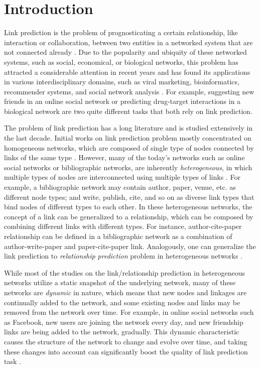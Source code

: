 \section{Introduction}\label{sec:intro}
Link prediction is the problem of prognosticating a certain relationship, like interaction or collaboration, between two entities in a networked system that are not connected already \cite{lu2011link}. Due to the popularity and ubiquity of these networked systems, such as social, economical, or biological networks, this problem has attracted a considerable attention in recent years and has found its applications in various interdisciplinary domains, such as viral marketing, bioinformatics, recommender systems, and social network analysis \cite{wasserman1994social}. For example, suggesting new friends in an online social network \cite{liben2007link} or predicting drug-target interactions in a biological network \cite{chen2012drug} are two quite different tasks that both rely on link prediction.

The problem of link prediction has a long literature and is studied extensively in the last decade. Initial works on link prediction problem mostly concentrated on homogeneous networks, which are composed of single type of nodes connected by links of the same type \cite{liben2007link, wang2007local, lichtenwalter2010new}. However, many of the today's networks such as online social networks or bibliographic networks, are inherently \emph{heterogeneous}, in which multiple types of nodes are interconnected using multiple types of links \cite{taskar2004link, shi2017survey}. For example, a bibliographic network may contain author, paper, venue, etc. as different node types; and write, publish, cite, and so on as diverse link types that bind nodes of different types to each other. In these heterogeneous networks, the concept of a link can be generalized to a relationship, which can be composed by combining different links with different types. For instance, author-cite-paper relationship can be defined in a bibliographic network as a combination of author-write-paper and paper-cite-paper link. Analogously, one can generalize the link prediction to \emph{relationship prediction} problem in heterogeneous networks \cite{sun2012will}.

While most of the studies on the link/relationship prediction in heterogeneous networks utilize a static snapshot of the underlying network, many of these networks are \emph{dynamic} in nature, which means that new nodes and linkages are continually added to the network, and some existing nodes and links may be removed from the network over time. For example, in online social networks such as Facebook, new users are joining the network every day, and new friendship links are being added to the network, gradually. This dynamic characteristic causes the structure of the network to change and evolve over time, and taking these changes into account can significantly boost the quality of link prediction task \cite{potgieter2009temporality}.

